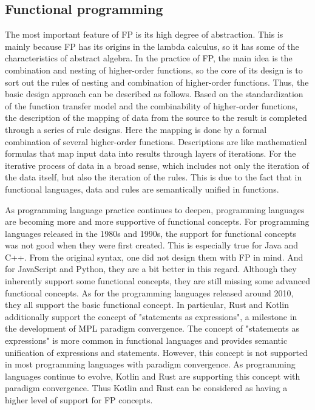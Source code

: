 \subsection{Functional programming}

The most important feature of FP is its high degree of abstraction. This is mainly because FP has its origins in the lambda calculus, so it has some of the characteristics of abstract algebra. In the practice of FP, the main idea is the combination and nesting of higher-order functions, so the core of its design is to sort out the rules of nesting and combination of higher-order functions. Thus, the basic design approach can be described as follows. Based on the standardization of the function transfer model and the combinability of higher-order functions, the description of the mapping of data from the source to the result is completed through a series of rule designs. Here the mapping is done by a formal combination of several higher-order functions. Descriptions are like mathematical formulas that map input data into results through layers of iterations. For the iterative process of data in a broad sense, which includes not only the iteration of the data itself, but also the iteration of the rules. This is due to the fact that in functional languages, data and rules are semantically unified in functions.

As programming language practice continues to deepen, programming languages are becoming more and more supportive of functional concepts. For programming languages released in the 1980s and 1990s, the support for functional concepts was not good when they were first created. This is especially true for Java and C++. From the original syntax, one did not design them with FP in mind. And for JavaScript and Python, they are a bit better in this regard. Although they inherently support some functional concepts, they are still missing some advanced functional concepts. As for the programming languages released around 2010, they all support the basic functional concept. In particular, Rust and Kotlin additionally support the concept of "statements as expressions", a milestone in the development of MPL paradigm convergence. The concept of "statements as expressions" is more common in functional languages and provides semantic unification of expressions and statements. However, this concept is not supported in most programming languages with paradigm convergence. As programming languages continue to evolve, Kotlin and Rust are supporting this concept with paradigm convergence. Thus Kotlin and Rust can be considered as having a higher level of support for FP concepts.


